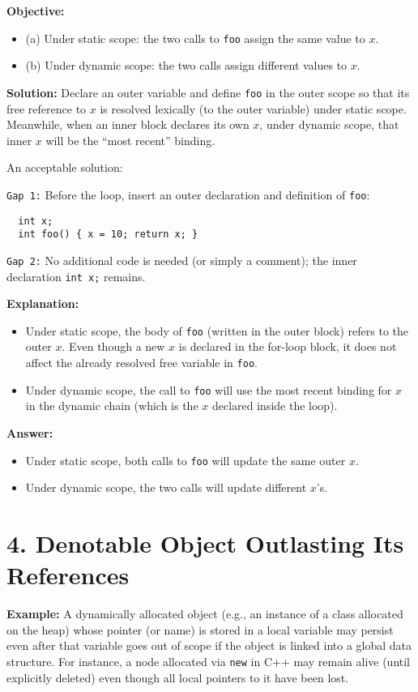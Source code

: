 \documentclass[12pt]{article}
\begin{document}
\textbf{Objective:}
\begin{itemize}
  \item (a) Under static scope: the two calls to \texttt{foo} assign the same value to \( x \).
  \item (b) Under dynamic scope: the two calls assign different values to \( x \).
\end{itemize}

\textbf{Solution:}
Declare an outer variable and define \texttt{foo} in the outer scope so that its free reference to \( x \) is resolved lexically (to the outer variable) under static scope. Meanwhile, when an inner block declares its own \( x \), under dynamic scope, that inner \( x \) will be the “most recent” binding.

An acceptable solution:

\texttt{Gap 1:} Before the loop, insert an outer declaration and definition of \texttt{foo}:
\begin{verbatim}
  int x; 
  int foo() { x = 10; return x; }
\end{verbatim}

\texttt{Gap 2:} No additional code is needed (or simply a comment); the inner declaration \texttt{int x;} remains.

\textbf{Explanation:}
\begin{itemize}
  \item Under static scope, the body of \texttt{foo} (written in the outer block) refers to the outer \( x \). Even though a new \( x \) is declared in the for-loop block, it does not affect the already resolved free variable in \texttt{foo}.
  \item Under dynamic scope, the call to \texttt{foo} will use the most recent binding for \( x \) in the dynamic chain (which is the \( x \) declared inside the loop).
\end{itemize}

\textbf{Answer:} 
\begin{itemize}
  \item Under static scope, both calls to \texttt{foo} will update the same outer \( x \).
  \item Under dynamic scope, the two calls will update different \( x \)'s.
\end{itemize}

\section*{4. Denotable Object Outlasting Its References}
\textbf{Example:} A dynamically allocated object (e.g., an instance of a class allocated on the heap) whose pointer (or name) is stored in a local variable may persist even after that variable goes out of scope if the object is linked into a global data structure. For instance, a node allocated via \texttt{new} in C++ may remain alive (until explicitly deleted) even though all local pointers to it have been lost.
\end{document}
